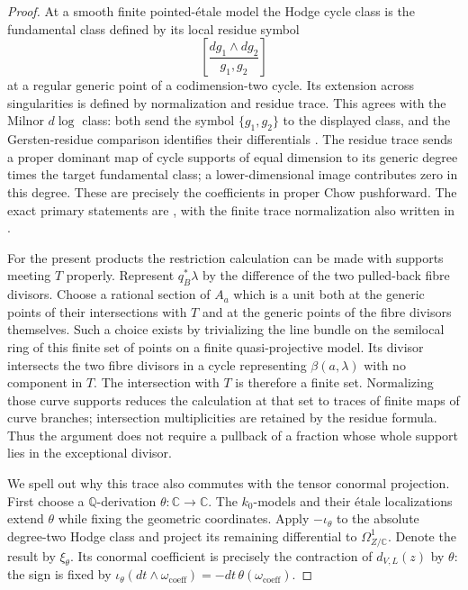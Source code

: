 \begin{proof}
At a smooth finite pointed-\'etale model the Hodge cycle class
is the fundamental class defined by its local residue symbol
\[
                   \left[\frac{dg_1\wedge dg_2}{g_1,g_2}\right]
\]
at a regular generic point of a codimension-two cycle.
Its extension across singularities is defined by normalization
and residue trace. This agrees with the Milnor $d\log$ class:
both send the symbol $\{g_1,g_2\}$ to the displayed class,
and the Gersten-residue comparison identifies their differentials
\citep[Section~4, pp.~559--560]{cyBraunling2013}.
The residue trace sends a proper dominant map of cycle supports
of equal dimension to its generic degree times the target
fundamental class; a lower-dimensional image contributes zero
in this degree. These are precisely the coefficients in proper
Chow pushforward. The exact primary statements are
\citet[Section~2.4, pp.~31--32, and Section~3.1, Proposition~2,
p.~41]{cyElZein1978}, with the finite trace normalization also
written in \citet[Proposition~2.1.2, pp.~15--16]{cyElZein1974}.

For the present products the restriction calculation can be made
with supports meeting $T$ properly. Represent $q_B^*\lambda$
by the difference of the two pulled-back fibre divisors. Choose
a rational section of $A_a$ which is a unit both at the generic
points of their intersections with $T$ and at the generic
points of the fibre divisors themselves. Such a choice exists by
trivializing the line bundle on the semilocal ring of this
finite set of points on a finite quasi-projective model.
Its divisor intersects the two fibre divisors in a cycle
representing $\beta(a,\lambda)$ with no component in $T$.
The intersection with $T$ is therefore a finite set.
Normalizing those curve supports reduces the calculation at
that set to traces of finite maps of curve branches; intersection
multiplicities are retained by the residue formula. Thus the
argument does not require a pullback of a fraction whose whole
support lies in the exceptional divisor.

We spell out why this trace also commutes with the tensor
conormal projection. First choose a $\mathbb Q$-derivation
$\theta:\mathbb C\to\mathbb C$. The $k_0$-models and their
\'etale localizations extend $\theta$ while fixing the geometric
coordinates. Apply $-\iota_\theta$ to the absolute degree-two
Hodge class and project its remaining differential to
$\Omega^1_{Z/\mathbb C}$. Denote the result by $\xi_\theta$.
Its conormal coefficient is precisely the contraction of
$d_{V,L}(z)$ by $\theta$: the sign is fixed by
$\iota_\theta(dt\wedge\omega_{\mathrm{coeff}})
       =-dt\,\theta(\omega_{\mathrm{coeff}})$.


\end{proof}
